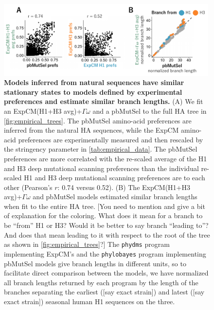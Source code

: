 \documentclass[11pt]{article}
\newcommand\jdbcomment[1]{{\color{red}[#1]}}
\begin{document}
\begin{figure}
\centerline{\includegraphics[width=0.99\textwidth]{figures/phylobayes.pdf}}
\caption{\label{fig:phylobayes}
\textbf{Models inferred from natural sequences have similar stationary states to models defined by experimental preferences and estimate similar branch lengths.}
(A) We fit an ExpCM(H1+H3 avg)+$\Gamma\omega$ and a pbMutSel to the full HA tree in \ref{fig:empirical_trees}. 
The pbMutSel amino-acid preferences are inferred from the natural HA sequences, while the ExpCM amino-acid preferences are experimentally measured and then rescaled by the stringency parameter in \ref{tab:empirical_data}. 
The pbMutSel preferences are more correlated with the re-scaled average of the H1 and H3 deep mutational scanning preferences than the individual re-scaled H1 and H3 deep mutational scanning preferences are to each other (Pearson's $r$: 0.74 versus 0.52). 
(B) The ExpCM(H1+H3 avg)+$\Gamma\omega$ and pbMutSel models estimated similar branch lengths when fit to the entire HA tree. 
\jdbcomment{You need to mention and give a bit of explanation for the coloring. What does it mean for a branch to be ``from'' H1 or H3? Would it be better to say branch ``leading to''? And does that mean leading to it with respect to the root of the tree as shown in \ref{fig:empirical_trees}?}
The \texttt{phydms} program implementing ExpCM's and the \texttt{phylobayes} program implementing pbMutSel models give branch lengths in different units, so to facilitate direct comparison between the models, we have normalized all branch lengths returned by each program by the length of the branches separating the earliest (\jdbcomment{say exact strain}) and latest (\jdbcomment{say exact strain}) seasonal human H1 sequences on the three. 
}
\end{figure}
\end{document}
